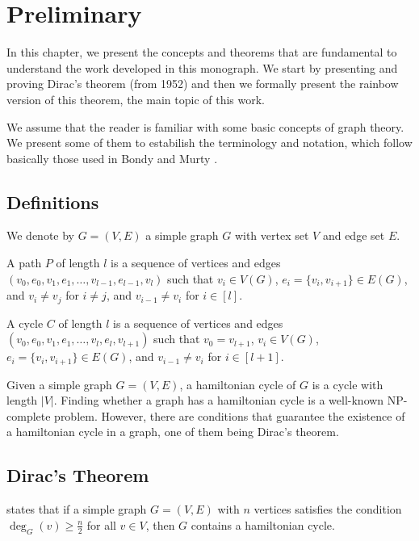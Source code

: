 
\chapter{Preliminary}

In this chapter, we present the concepts and theorems that are fundamental to understand the 
work developed in this monograph. We start by presenting and proving Dirac's theorem (from 1952) \cite{dirac1952} 
and then we formally present the rainbow version of this theorem, the main topic of this work.

We assume that the reader is familiar with some basic concepts of graph theory. We present some 
of them to estabilish the terminology and notation, which follow basically those used in Bondy and Murty \cite{bondy1976}.

\section{Definitions}

We denote by $G = (V, E)$ a simple graph $G$ with vertex set $V$ and edge set $E$.

A path $P$ of length $l$ is a sequence of vertices and edges $(v_0, e_0, v_1, e_1, \ldots, v_{l - 1}, e_{l - 1}, v_{l})$ such that
$v_i \in V(G)$, $e_i = \{v_i, v_{i + 1}\} \in E(G)$, and $v_i \neq v_j$ for $i \neq j$, and $v_{i-1} \neq v_{i}$ for $i \in [l]$.

A cycle $C$ of length $l$ is a sequence of vertices and edges $(v_0, e_0, v_1, e_1, \ldots, v_{l}, e_{l}, v_{l + 1})$ such that
$v_{0} = v_{l + 1}$, $v_i \in V(G)$, $e_i = \{v_i, v_{i + 1}\} \in E(G)$, and $v_{i-1} \neq v_{i}$ for $i \in [l + 1]$.

Given a simple graph $G = (V, E)$, a hamiltonian cycle of $G$ is a cycle with length $|V|$.
Finding whether a graph has a hamiltonian cycle is a well-known NP-complete problem. 
However, there are conditions that guarantee the existence of a hamiltonian cycle in a graph, one of them being Dirac's theorem.

\section{Dirac's Theorem}

\cite{dirac1952} states that if a simple graph $G = (V, E)$ with $n$ vertices satisfies the condition $\deg_G(v) \geq \frac{n}{2}$ for all $v \in V$, 
then $G$ contains a hamiltonian cycle.

